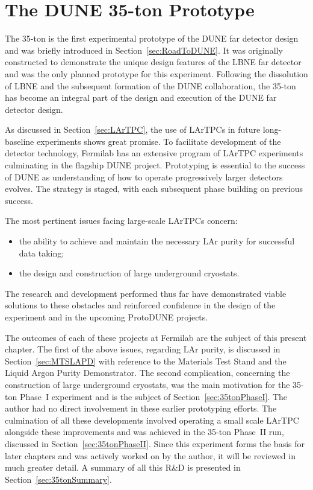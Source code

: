 
\graphicspath{{35ton/Figs/}}

\chapter{The DUNE 35-ton Prototype}\label{chap:35ton}

The 35-ton is the first experimental prototype of the DUNE far detector design and was briefly introduced in Section~\ref{sec:RoadToDUNE}.  It was originally constructed to demonstrate the unique design features of the LBNE far detector and was the only planned prototype for this experiment.  Following the dissolution of LBNE and the subsequent formation of the DUNE collaboration, the 35-ton has become an integral part of the design and execution of the DUNE far detector design.

As discussed in Section~\ref{sec:LArTPC}, the use of LArTPCs in future long-baseline experiments shows great promise.  To facilitate development of the detector technology, Fermilab has an extensive program of LArTPC experiments culminating in the flagship DUNE project.  Prototyping is essential to the success of DUNE as understanding of how to operate progressively larger detectors evolves.  The strategy is staged, with each subsequent phase building on previous success.

The most pertinent issues facing large-scale LArTPCs concern:
\begin{itemize}
  \item the ability to achieve and maintain the necessary LAr purity for successful data taking;
  \item the design and construction of large underground cryostats.
\end{itemize}
The research and development performed thus far have demonstrated viable solutions to these obstacles and reinforced confidence in the design of the experiment and in the upcoming ProtoDUNE projects.

The outcomes of each of these projects at Fermilab are the subject of this present chapter.  The first of the above issues, regarding LAr purity, is discussed in Section~\ref{sec:MTSLAPD} with reference to the Materials Test Stand and the Liquid Argon Purity Demonstrator.  The second complication, concerning the construction of large underground cryostats, was the main motivation for the 35-ton Phase~I experiment and is the subject of Section~\ref{sec:35tonPhaseI}.  The author had no direct involvement in these earlier prototyping efforts.  The culmination of all these developments involved operating a small scale LArTPC alongside these improvements and was achieved in the 35-ton Phase~II run, discussed in Section~\ref{sec:35tonPhaseII}.  Since this experiment forms the basis for later chapters and was actively worked on by the author, it will be reviewed in much greater detail.  A summary of all this R\&D is presented in Section~\ref{sec:35tonSummary}.

